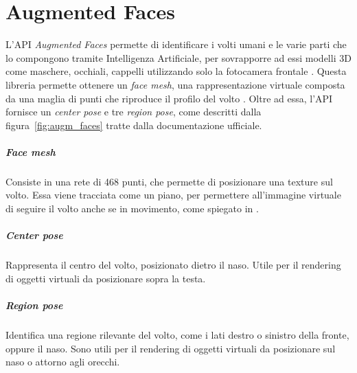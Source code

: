 \documentclass[crop=false, class=book]{standalone}
\begin{document}
	\chapter{Augmented Faces}
	L'API \textit{Augmented Faces} permette di identificare i volti umani e le varie parti che lo compongono tramite Intelligenza Artificiale, per sovrapporre ad essi modelli 3D come maschere, occhiali, cappelli utilizzando solo la fotocamera frontale \cite{google2022faces}. 
	Questa libreria permette ottenere un \textit{face mesh}, una rappresentazione virtuale composta da una maglia di punti che riproduce il profilo del volto \cite{oufqir2020arkit}. Oltre ad essa, l'API fornisce un \textit{center pose} e tre \textit{region pose}, come descritti dalla figura~\vref{fig:augm_faces} tratte dalla documentazione ufficiale.
	\paragraph*{Face mesh}
		Consiste in una rete di 468 punti, che permette di posizionare una texture sul volto. Essa viene tracciata come un piano, per permettere all'immagine virtuale di seguire il volto anche se in movimento, come spiegato in \cite{googleblog2019faces}.
	\paragraph*{Center pose}
		Rappresenta il centro del volto, posizionato dietro il naso. Utile per il rendering di oggetti virtuali da posizionare sopra la testa.
	\paragraph*{Region pose}
		Identifica una regione rilevante del volto, come i lati destro o sinistro della fronte, oppure il naso. Sono utili per il rendering di oggetti virtuali da posizionare sul naso o attorno agli orecchi.
	
\end{document}
